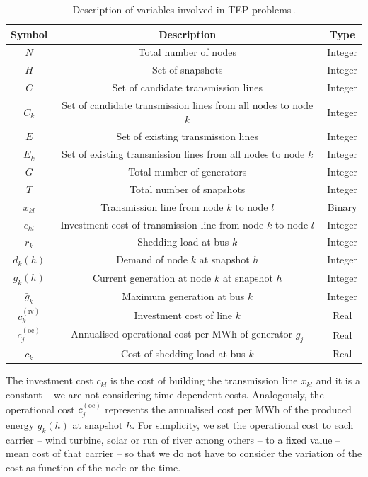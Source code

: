 \begin{table}[H]
\centering
\begin{tabular}{|c||c|c|} 
 \hline	
 \textbf{Symbol} & \textbf{Description} & \textbf{Type} \\
 \hline	
 $N$ & Total number of nodes & Integer\\
  \hline	
  $H$ & Set of snapshots & Integer\\
  \hline
 $C$ & Set of candidate transmission lines & Integer\\
    \hline	
 $C_{k}$ & Set of candidate transmission lines from all nodes to node $k$ & Integer\\
  \hline	
 $E$ & Set of existing transmission lines & Integer\\
   \hline	
 $E_{k}$ & Set of existing transmission lines from all nodes to node $k$ & Integer\\
  \hline	
 $G$ & Total number of generators & Integer\\
  \hline	
 $T$ & Total number of snapshots & Integer\\
  \hline	
 $x_{kl}$ & Transmission line from node $k$ to node $l$ & Binary\\
  \hline
  $c_{kl}$ & Investment cost of transmission line from node $k$ to node $l$ & Integer\\
  \hline
  $r_{k}$ & Shedding load at bus $k$ & Integer\\
  \hline	
 $d_{k}(h)$ & Demand of node $k$ at snapshot $h$ & Integer\\
  \hline	
 $g_{k}(h)$ & Current generation at node $k$ at snapshot $h$ & Integer\\
  \hline	
 $\bar{g}_{k}$ & Maximum generation at bus $k$ & Integer\\
  \hline	
 $c_{k}^{(\text{iv})}$ & Investment cost of line $k$ & Real\\
  \hline	
  $c_{j}^{(\text{oc})}$ & Annualised operational cost per MWh of generator $g_{j}$ & Real\\
  \hline
  $c_{k}$ & Cost of shedding load at bus $k$ & Real\\
  \hline
\end{tabular}
\caption{Description of variables involved in TEP problems\,\cite{Dilwali2016}.}
\label{table:TEPNomenclature}
\end{table}
The investment cost $c_{kl}$ is the cost of building the transmission line $x_{kl}$ and it is a constant -- we are not considering time-dependent costs. Analogously, the operational cost $c_{j}^{(\text{oc})}$ represents the annualised cost per MWh of the produced energy $g_{k}(h)$ at snapshot $h$. For simplicity, we set the operational cost to each carrier -- wind turbine, solar or run of river among others -- to a fixed value -- mean cost of that carrier -- so that we do not have to consider the variation of the cost as function of the node or the time.\\\\
